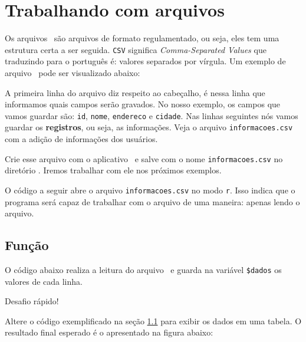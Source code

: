 \section{Trabalhando com arquivos \csvextensao}
\label{trabalhando-com-arquivos-csv}

Os arquivos \csvextensao~são arquivos de formato regulamentado, ou seja, eles tem
uma estrutura certa a ser seguida. \texttt{CSV} significa \textit{Comma-Separated Values}
que traduzindo para o português é: valores separados por vírgula. Um exemplo de arquivo 
\csvextensao~pode ser visualizado abaixo:



A primeira linha do arquivo diz respeito ao cabeçalho, é nessa linha que informamos
quais campos serão gravados. No nosso exemplo, os campos que vamos guardar são:
\texttt{id}, \texttt{nome}, \texttt{endereco} e \texttt{cidade}. Nas linhas seguintes
nós vamos guardar os \textbf{registros}, ou seja, as informações. Veja o arquivo
\texttt{informacoes.csv} com a adição de informações dos usuários.



Crie esse arquivo com o aplicativo \sublime~e salve com o nome \texttt{informacoes.csv}
no diretório . Iremos trabalhar com ele nos próximos
exemplos.

O código a seguir abre o arquivo \texttt{informacoes.csv} no modo \texttt{r}. Isso 
indica que o programa será capaz de trabalhar com o arquivo de uma maneira: 
apenas lendo o arquivo.

\subsection{Função \funcaogetcsv}
\label{funcao-getcsv}

O código abaixo realiza a leitura do arquivo \csvextensao~e guarda na variável
\texttt{\$dados} os valores de cada linha.




\begin{framed}
{\Large Desafio rápido!}

Altere o código exemplificado na seção \ref{funcao-getcsv} para exibir os dados
em uma tabela. O resultado final esperado é o apresentado na figura abaixo:


\end{framed}


